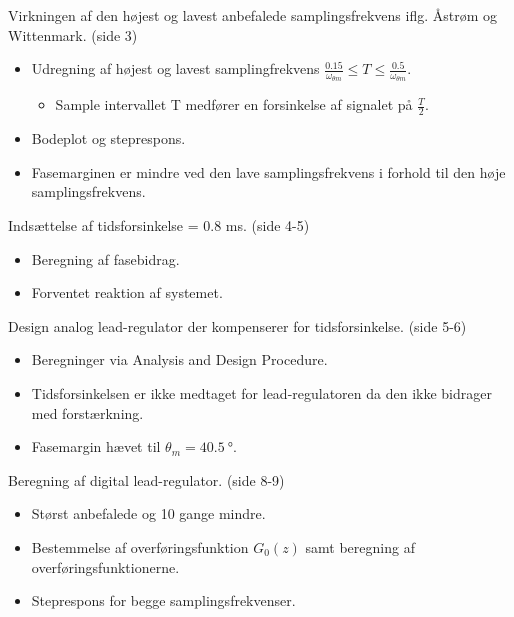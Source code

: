\documentclass[danish]{article}
\begin{document}
\vspace{3mm}
Virkningen af den højest og lavest anbefalede samplingsfrekvens iflg. Åstrøm og Wittenmark. (side 3)
\begin{itemize}
	\item Udregning af højest og lavest samplingfrekvens $\frac{0.15}{\omega_{\theta m}} \leq T \leq\frac{0.5}{\omega_{\theta m}}$.
	\begin{itemize}
		\item Sample intervallet T medfører en forsinkelse af signalet på $\frac{T}{2}$.
	\end{itemize}
	\item Bodeplot og steprespons.
	\item Fasemarginen er mindre ved den lave samplingsfrekvens i forhold til den høje samplingsfrekvens.
\end{itemize}
\vspace{3mm}
Indsættelse af tidsforsinkelse = 0.8 ms. (side 4-5)
\begin{itemize}
	\item Beregning af fasebidrag.
	\item Forventet reaktion af systemet.
\end{itemize}
\vspace{3mm}
Design analog lead-regulator der kompenserer for tidsforsinkelse. (side 5-6)
\begin{itemize}
	\item Beregninger via Analysis and Design Procedure.
	\item Tidsforsinkelsen er ikke medtaget for lead-regulatoren da den ikke bidrager med forstærkning.
	\item Fasemargin hævet til $\theta_m = \SI{40,5}{\degree}$.
\end{itemize}
\vspace{3mm}
Beregning af digital lead-regulator. (side 8-9)
\begin{itemize}
	\item Størst anbefalede og 10 gange mindre. 
	\item Bestemmelse af overføringsfunktion $G_0(z)$ samt beregning af overføringsfunktionerne. 
	\item Steprespons for begge samplingsfrekvenser.
\end{itemize}
\vspace{3mm}
\end{document}
